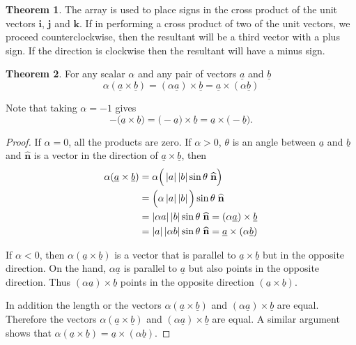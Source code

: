 \documentclass[11pt,a4paper]{article}
\theoremstyle{definition}
\newtheorem{thm}{Theorem}[subsection]
\begin{document}
\begin{thm}
The array is used to place signs in the cross product of the unit vectors $\textbf{i}$, $\textbf{j}$ and $\textbf{k}$. If in performing a cross product of two of the unit vectors, we proceed counterclockwise, then the resultant will be a third vector with a plus sign. If the direction is clockwise then the resultant will have a minus sign.
\end{thm}


\begin{thm}


For any scalar $\alpha$ and any pair of vectors $\underline{a}$ and $\underline{b}$ $$\alpha (\underline{a} \times \underline{b}) = (\alpha \underline{a}) \times \underline{b} =\underline{a} \times (\alpha \underline{b})$$

Note that taking $\alpha = -1$ gives $$-\big(\underline{a}\times \underline{b}\big) = \big(-\underline{a}\big)\times \underline{b}=\underline{a}\times \big(-\underline{b}\big).$$
\end{thm}


\begin{proof}


If $\alpha = 0$, all the products are zero. If $\alpha > 0$, $ \theta $ is an angle between $\underline{a}$ and $\underline{b}$ and $\widehat{\textbf{n}}$ is a vector in the direction of $\underline{a} \times \underline{b}$, then
\begin{align*}
\alpha (\underline{a} \times \underline{b}) & = \alpha \Big( \left|a\right|\left|b\right| \sin \theta \hspace{0.1cm}\widehat{\textbf{n}}\Big)\\
& =\Big(\alpha  \left|a\right|\left|b\right|\Big) \sin \theta \hspace{0.1cm}\widehat{\textbf{n}}\\
& = \left|\alpha a\right|\left|b\right| \sin \theta \hspace{0.1cm}\widehat{\textbf{n}}=(\alpha \underline{a} ) \times \underline{b}\\
& = \left|a\right|\left|\alpha b\right| \sin \theta \hspace{0.1cm}\widehat{\textbf{n}}= \underline{a}\times (\alpha \underline{b})
\end{align*}

If $\alpha < 0$, then $\alpha (\underline{a} \times \underline{b})$ is a vector that is parallel to $\underline{a} \times \underline{b}$ but in the opposite direction. On the hand, $\alpha \underline{a}$ is parallel to $\underline{a}$ but also points in the opposite direction. Thus $(\alpha \underline{a}) \times \underline{b}$ points in the opposite direction $(\underline{a} \times \underline{b})$.


In addition the length or the vectors $\alpha (\underline{a} \times \underline{b})$ and $(\alpha \underline{a}) \times \underline{b}$ are equal. Therefore the vectors $\alpha(\underline{a} \times \underline{b})$ and $(\alpha \underline{a})\times \underline{b}$ are equal. A similar argument shows that $\alpha(\underline{a}\times \underline{b}) = \underline{a} \times (\alpha \underline{b})$.
\end{proof}
\end{document}
